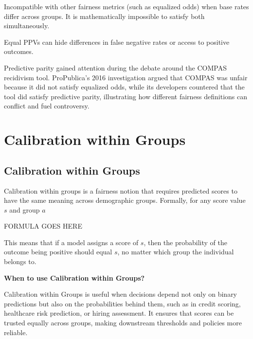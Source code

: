 {
\item Incompatible with other fairness metrics (such as equalized odds) when base rates differ across groups. It is mathematically
impossible to satisfy both simultaneously.
\item Equal PPVs can hide differences in false negative rates or access to positive outcomes.
}

\clearpage

\thispagestyle{customstyle}

{Predictive parity gained attention during the debate around the COMPAS recidivism tool. ProPublica’s 2016 investigation argued that COMPAS was
unfair because it did not satisfy equalized odds, while its developers countered that the tool did satisfy predictive parity, illustrating how
different fairness definitions can conflict and fuel controversy.}

\clearpage
\thispagestyle{biasfairnesstyle}
\section{Calibration within Groups}
\subsection{Calibration within Groups}

Calibration within groups is a fairness notion that requires predicted scores to have the same meaning across demographic groups.
Formally, for any score value $s$ and group $a$

\begin{center}
    FORMULA GOES HERE
\end{center}

This means that if a model assigns a score of $s$, then the probability of the outcome being positive should equal $s$,
no matter which group the individual belongs to.

\textbf{When to use Calibration within Groups?}

Calibration within Groups is useful when decisions depend not only on binary predictions but also on the probabilities behind them, 
such as in credit scoring, healthcare risk prediction, or hiring assessment. It ensures that scores can be trusted equally across groups,
making downstream thresholds and policies more reliable.

